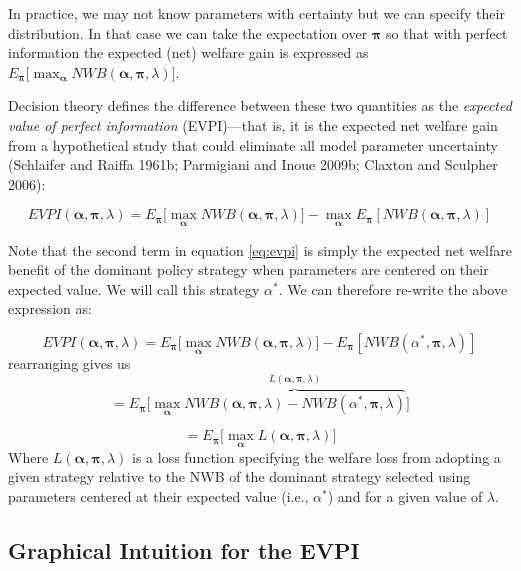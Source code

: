 \documentclass[
  10pt,
]{article}
\begin{document}
In practice, we may not know parameters with certainty but we can
specify their distribution. In that case we can take the expectation
over \(\boldsymbol{\pi}\) so that with perfect information the expected
(net) welfare gain is expressed as
\(E_{\boldsymbol{\pi}} \big [ \max_{\boldsymbol{\alpha}} NWB(\boldsymbol{\alpha},\boldsymbol{\pi},\lambda) \big ]\).

Decision theory defines the difference between these two quantities as
the \emph{expected value of perfect information} (EVPI)---that is, it is
the expected net welfare gain from a hypothetical study that could
eliminate all model parameter uncertainty (Schlaifer and Raiffa 1961b;
Parmigiani and Inoue 2009b; Claxton and Sculpher 2006):

\begin{equation}
\label{eq:evpi}
EVPI(\boldsymbol{\alpha},\boldsymbol{\pi},\lambda) =  E_{\boldsymbol{\pi}} \big [ \max_{\boldsymbol{\alpha}} NWB(\boldsymbol{\alpha},\boldsymbol{\pi},\lambda) \big ] - \max_{\boldsymbol{\alpha}} E_{\boldsymbol{\pi}}[NWB(\boldsymbol{\alpha},\boldsymbol{\pi},\lambda)]
\end{equation}

Note that the second term in equation \ref{eq:evpi} is simply the
expected net welfare benefit of the dominant policy strategy when
parameters are centered on their expected value. We will call this
strategy \(\alpha^*\). We can therefore re-write the above expression
as:

\[
EVPI(\boldsymbol{\alpha},\boldsymbol{\pi},\lambda) =  E_{\boldsymbol{\pi}} \big [ \max_{\boldsymbol{\alpha}} NWB(\boldsymbol{\alpha},\boldsymbol{\pi},\lambda) \big ] -  E_{\boldsymbol{\pi}}[NWB(\alpha^*,\boldsymbol{\pi},\lambda)]
\] rearranging gives us \[
=  E_{\boldsymbol{\pi}} \big [ \max_{\boldsymbol{\alpha}} \overbrace{ NWB(\boldsymbol{\alpha},\boldsymbol{\pi},\lambda)  -  NWB(\alpha^*,\boldsymbol{\pi},\lambda)} ^{L(\boldsymbol{\alpha},\boldsymbol{\pi},\lambda)} \big ] 
\]

\[
= E_{\boldsymbol{\pi}} \big [\max_{\boldsymbol{\alpha}}  L(\boldsymbol{\alpha},\boldsymbol{\pi},\lambda) \big ]
\] Where \(L(\boldsymbol{\alpha},\boldsymbol{\pi},\lambda)\) is a loss
function specifying the welfare loss from adopting a given strategy
relative to the NWB of the dominant strategy selected using parameters
centered at their expected value (i.e., \(\alpha^*\)) and for a given
value of \(\lambda\).

\hypertarget{graphical-intuition-for-the-evpi}{%
\subsection{Graphical Intuition for the
EVPI}\label{graphical-intuition-for-the-evpi}}
\end{document}
